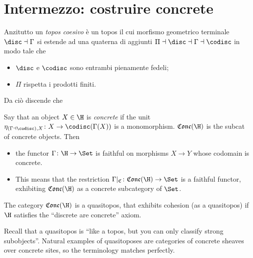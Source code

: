 \documentclass[10pt,a4paper]{amsart}
\begin{document}
\section{Intermezzo: costruire concrete}
Anzitutto un \emph{topos coesivo} è un topos il cui morfismo geometrico terminale $\disc\dashv\Gamma$ si estende ad una quaterna di aggiunti $\Pi\dashv \disc\dashv \Gamma\dashv\codisc$ in modo tale che
\begin{itemize}
\item $\disc$ e $\codisc$ sono entrambi pienamente fedeli;
\item $\Pi$ rispetta i prodotti finiti.
\end{itemize}
Da ciò discende che 
\begin{proposition}
Say that an object $X\in\H$ is \emph{concrete} if the unit $\eta_{(\Gamma\dashv\codisc),X}\colon X\to \codisc(\Gamma(X))$ is a monomorphism. $\mathfrak{Conc}(\H)$ is the subcat of concrete objects. Then
\begin{itemize}
\item the functor $\Gamma\colon\H\to\Set$ is faithful on morphisms $X\to Y$ whose codomain is concrete.
\item This means that the restriction $\Gamma|_{\mathfrak{C}}\colon\mathfrak{Conc}(\H)\to \Set$ is a faithful functor, exhibiting $\mathfrak{Conc}(\H)$ as a concrete subcategory of $\Set$.
\end{itemize}
\end{proposition}
\begin{proposition}
The category $\mathfrak{Conc}(\H)$ is a quasitopos, that exhibits cohesion (as a quasitopos) if $\H$ satisfies the ``discrete are concrete'' axiom.
\end{proposition}
Recall that a quasitopos is ``like a topos, but you can only classify strong subobjects''. Natural examples of quasitoposes are categories of concrete sheaves over concrete sites, so the terminology matches perfectly.
\end{document}
